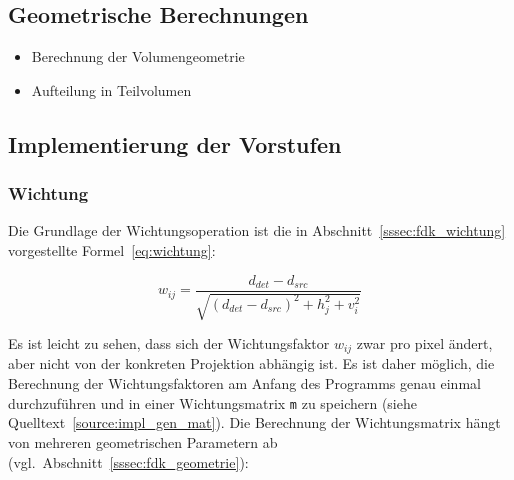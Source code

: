 \subsection{Geometrische Berechnungen}

\begin{itemize}
    \item Berechnung der Volumengeometrie
    \item Aufteilung in Teilvolumen
\end{itemize}

\subsection{Implementierung der Vorstufen}

\subsubsection{Wichtung}

Die Grundlage der Wichtungsoperation ist die in Abschnitt~\ref{sssec:fdk_wichtung} vorgestellte
Formel~\ref{eq:wichtung}:

\begin{equation*}
    w_{ij} = \frac{d_{det} - d_{src}}{\sqrt{(d_{det} - d_{src})^2 + h_j^2 + v_i^2}}
\end{equation*}

Es ist leicht zu sehen, dass sich der Wichtungsfaktor $w_{ij}$ zwar pro \gls{pixel} ändert, aber nicht von der konkreten
Projektion abhängig ist. Es ist daher möglich, die Berechnung der Wichtungsfaktoren am Anfang des Programms genau einmal
durchzuführen und in einer Wichtungsmatrix \texttt{m} zu speichern (siehe Quelltext~\ref{source:impl_gen_mat}). Die
Berechnung der Wichtungsmatrix hängt von mehreren geometrischen Parametern ab (vgl.\
Abschnitt~\ref{sssec:fdk_geometrie}):

